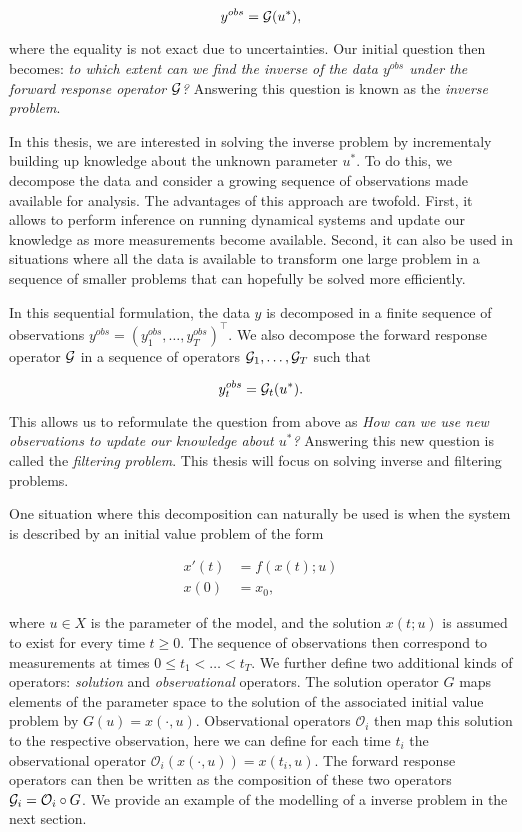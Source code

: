 \begin{equation}\label{inverse-formula}
  y^{obs} = \mathcal{G}(u^*),
\end{equation}

where the equality is not exact due to uncertainties. Our initial question then becomes: \textit{to which extent can we find the inverse of the data $y^{obs}$ under the forward response operator $\mathcal{G}$?} Answering this question is known as the \textit{inverse problem}.

In this thesis, we are interested in solving the inverse problem by incrementaly building up knowledge about the unknown parameter $u^*$. To do this, we decompose the data and consider a growing sequence of observations made available for analysis. The advantages of this approach are twofold. First, it allows to perform inference on running dynamical systems and update our knowledge as more measurements become available. Second, it can also be used in situations where all the data is available to transform one large problem in a sequence of smaller problems that can hopefully be solved more efficiently.

In this sequential formulation, the data $y$ is decomposed in a finite sequence of observations $y^{obs} = (y^{obs}_1, \ldots, y^{obs}_T)^\top$. We also decompose the forward response operator $\mathcal{G}$ in a sequence of operators $\mathcal{G}_1, \ldots, \mathcal{G}_T$ such that

\begin{equation*}
  y^{obs}_t = \mathcal{G}_t(u^*).
\end{equation*}


This allows us to reformulate the question from above as \textit{How can we use new observations to update our knowledge about $u^*$?} Answering this new question is called the \textit{filtering problem}. This thesis will focus on solving inverse and filtering problems.

One situation where this decomposition can naturally be used is when the system is described by an initial value problem of the form

\begin{equation}
  \begin{aligned}
    x'(t) &= f(x(t); u)\\
    x(0) &= x_0,
  \end{aligned}
\end{equation}  

where $u \in X$ is the parameter of the model, and the solution $x(t; u)$ is assumed to exist for every time $t \geq 0$. The sequence of observations then correspond to measurements at times  $0 \leq t_1 < \ldots < t_T$. We further define two additional kinds of operators: \textit{solution} and \textit{observational} operators. The solution operator $G$ maps elements of the parameter space to the solution of the associated initial value problem by $G(u) = x(\cdot, u)$. Observational operators $\mathcal{O}_i$ then map this solution to the respective observation, here we can define for each time $t_i$ the observational operator $\mathcal{O}_i(x(\cdot, u)) = x(t_i, u)$. The forward response operators can then be written as the composition of these two operators $\mathcal{G}_i = \mathcal{O}_i \circ G$. We provide an example of the modelling of a inverse problem in the next section.


